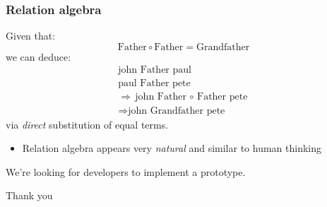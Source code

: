 \documentclass[17pt]{beamer}
\begin{document}


\begin{frame}
\frametitle{Relation algebra}
Given that:
\begin{equation}
\mbox{Father} \circ \mbox{Father} = \mbox{Grandfather}
\end{equation}
we can deduce:
\begin{eqnarray}
\mbox{john Father paul} \\
\mbox{paul Father pete} \\
\Rightarrow \mbox{john Father $\circ$ Father pete} \\
\Rightarrow \mbox{john Grandfather pete}
\end{eqnarray}
via \textit{direct} substitution of equal terms.
\begin{itemize}
	\item  Relation algebra appears very \textit{natural} and similar to human thinking
\end{itemize}
\end{frame}

\begin{frame}
We're looking for developers to implement a prototype.

\vspace*{1cm}
\Large{\centerline{Thank you}}

\end{frame}
\end{document}
